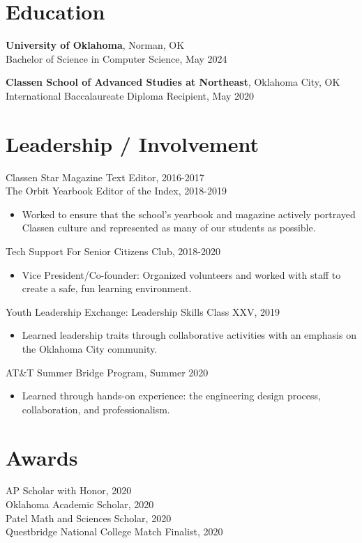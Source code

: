 \documentclass[12pt]{article}
\begin{document}
\section*{Education}
\textbf{University of Oklahoma}, Norman, OK \\
Bachelor of Science in Computer Science, May 2024

\textbf{Classen School of Advanced Studies at Northeast}, Oklahoma City, OK \\
International Baccalaureate Diploma Recipient, May 2020

\section*{Leadership / Involvement}
Classen Star Magazine Text Editor, 2016-2017 \\
The Orbit Yearbook Editor of the Index, 2018-2019 
\begin{itemize}
\item Worked to ensure that the school's yearbook and magazine actively portrayed Classen culture and represented as many of our students as possible.
\end{itemize}

Tech Support For Senior Citizens Club, 2018-2020 
\begin{itemize}
\item Vice President/Co-founder: Organized volunteers and worked with staff to create a safe, fun learning environment.
\end{itemize}

Youth Leadership Exchange: Leadership Skills Class XXV, 2019 
\begin{itemize}
\item Learned leadership traits through collaborative activities with an emphasis on the Oklahoma City community.
\end{itemize}

AT\&T Summer Bridge Program, Summer 2020 
\begin{itemize}
\item Learned through hands-on experience: the engineering design process, collaboration,  and professionalism.
\end{itemize}

\section*{Awards}
AP Scholar with Honor, 2020 \\
Oklahoma Academic Scholar, 2020 \\
Patel Math and Sciences Scholar, 2020 \\
Questbridge National College Match Finalist, 2020 
\end{document}
